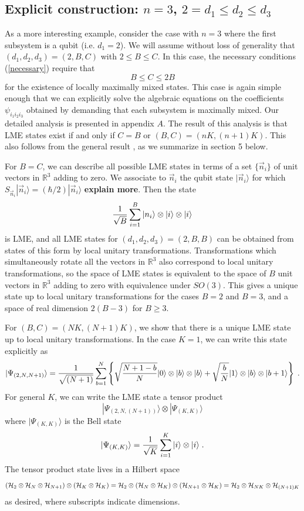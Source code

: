\documentclass[12pt]{article}
\theoremstyle{definition}
\newcommand{\be}{\begin{equation}}
\newcommand{\ee}{\end{equation}}
\begin{document}
\subsection{Explicit construction: $n=3$, $2 = d_1 \le d_2 \le d_3$}\label{sec:Explicit23}

As a more interesting example, consider the case with $n=3$ where the first subsystem is a qubit (i.e. $d_1 = 2$). We will assume without loss of generality that $(d_1, d_2, d_3) = (2,B,C)$ with $2 \le B \le C$. In this case, the necessary conditions (\ref{necessary}) require that
\be
B \le C \le 2 B
\ee
for the existence of locally maximally mixed states. This case is again simple enough that we can explicitly solve the algebraic equations on the coefficients $\psi_{i_1 i_2 i_3}$ obtained by demanding that each subsystem is maximally mixed. Our detailed analysis is presented in appendix $A$. The result of this analysis is that LME states exist if and only if $C=B$ or $(B,C) = (nK,(n+1)K)$. This also follows from the general result \cite{mathpaper}, as we summarize in section 5 below.


For $B=C$, we can describe all possible LME states in terms of a set $\{\vec{n}_i \}$ of unit vectors in $\mathbb{R}^3$ adding to zero. We associate to $\vec{n}_i$ the qubit state $|\vec{n}_i \rangle$ for which $S_{\vec{n}_i} |\vec{n}_i \rangle = (\hbar/2)|\vec{n}_i \rangle$ {\bf explain more}. Then the state
\be
{1 \over \sqrt{B}} \sum_{i=1}^B |n_{i} \rangle \otimes |i \rangle \otimes |i \rangle
\ee
is LME, and all LME states for $(d_1,d_2,d_3) = (2,B,B)$ can be obtained from states of this form by local unitary transformations. Transformations which simultaneously rotate all the vectors in $\mathbb{R}^3$ also correspond to local unitary transformations, so the space of LME states is equivalent to the space of $B$ unit vectors in $\mathbb{R}^3$ adding to zero with equivalence under $SO(3)$. This gives a unique state up to local unitary transformations for the cases $B=2$ and $B=3$, and a space of real dimension $2(B-3)$ for $B \ge 3$.

For $(B,C)=(NK,(N+1)K)$, we show that there is a unique LME state up to local unitary transformations. In the case $K=1$, we can write this state explicitly as
\be
|\Psi_{(2,N,N+1)} \rangle = {1 \over \sqrt{(N+1)}} \sum_{b=1}^N \left\{ \sqrt{N + 1 - b \over N} |0 \rangle \otimes  |b  \rangle \otimes |b \rangle + \sqrt{b \over N}  |1 \rangle \otimes|b \rangle \otimes |b+1 \rangle \right\} \; .
\ee
For general $K$, we can write the LME state a tensor product
\be
|\Psi_{(2,N,(N+1))} \rangle \otimes |\Psi_{(K,K)} \rangle
\ee
where $|\Psi_{(K,K)} \rangle$ is the Bell state
\be
|\Psi_{(K,K)} \rangle = {1 \over \sqrt{K}}  \sum_{i=1}^K  |i \rangle \otimes  |i \rangle \; .
\ee
The tensor product state lives in a Hilbert space
\be
({\cal H}_2 \otimes {\cal H}_N \otimes {\cal H}_{N+1}) \otimes ({\cal H}_K \otimes {\cal H}_K) = {\cal H}_2 \otimes ({\cal H}_N \otimes {\cal H}_K) \otimes ({\cal H}_{N+1} \otimes {\cal H}_K) = {\cal H}_2 \otimes {\cal H}_{NK} \otimes {\cal H}_{(N+1)K}
\ee
as desired, where subscripts indicate dimensions.
\end{document}
